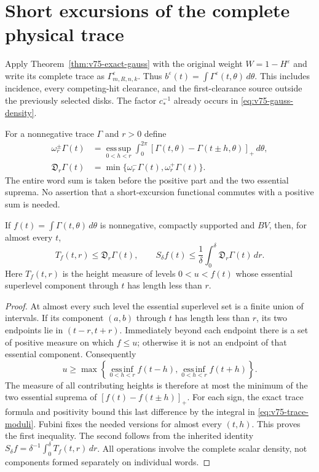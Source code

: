 \section{Short excursions of the complete physical trace}
\label{sec:v75-physical-tail}
Apply Theorem~\ref{thm:v75-exact-gauss} with the original weight
$W=1-H^\varepsilon$ and write its complete trace as
$\Gamma^\varepsilon_{m,R,n,k}$. Thus
$b^\varepsilon(t)=\int\Gamma^\varepsilon(t,\theta)\,d\theta$.
This includes incidence, every competing-hit clearance, and the
first-clearance source outside the previously selected disks.
The factor $c_*^{-1}$ already occurs in \eqref{eq:v75-gauss-density}.

For a nonnegative trace $\Gamma$ and $r>0$ define
\begin{align}
 \omega_r^\pm\Gamma(t)
  &=\operatorname*{ess\,sup}_{0<h<r}
      \int_0^{2\pi}[\Gamma(t,\theta)-\Gamma(t\pm h,\theta)]_+\,d\theta,
                                      \label{eq:v75-trace-moduli}\\
 \mathfrak D_r\Gamma(t)&=\min\{\omega_r^-\Gamma(t),\omega_r^+\Gamma(t)\}.
                                      \label{eq:v75-paired-trace}
\end{align}
The entire word sum is taken before the positive part and the two
essential suprema. No assertion that a short-excursion functional
commutes with a positive sum is needed.

\begin{lemma}
\label{lem:v75-trace-tail}
If $f(t)=\int\Gamma(t,\theta)\,d\theta$ is nonnegative,
compactly supported and $BV$, then, for almost every $t$,
\begin{equation}\label{eq:v75-trace-tail}
       T_f(t,r)\le\mathfrak D_r\Gamma(t),\qquad
       S_\delta f(t)\le\frac1\delta\int_0^\delta
                                     \mathfrak D_r\Gamma(t)\,dr.
\end{equation}
Here $T_f(t,r)$ is the height measure of levels $0<u<f(t)$ whose
essential superlevel component through $t$ has length less than $r$.
\end{lemma}
\begin{proof}
At almost every such level the essential superlevel set is a finite
union of intervals. If its component $(a,b)$ through $t$ has length
less than $r$, its two endpoints lie in $(t-r,t+r)$. Immediately
beyond each endpoint there is a set of positive measure on which
$f\le u$; otherwise it is not an endpoint of that essential component.
Consequently
\[
 u\ge\max\left\{
  \operatorname*{ess\,inf}_{0<h<r}f(t-h),
  \operatorname*{ess\,inf}_{0<h<r}f(t+h)\right\}.
\]
The measure of all contributing heights is therefore at most the
minimum of the two essential suprema of $[f(t)-f(t\pm h)]_+$.
For each sign, the exact trace formula and positivity bound this
last difference by the integral in \eqref{eq:v75-trace-moduli}.
Fubini fixes the needed versions for almost every $(t,h)$.
This proves the first inequality. The second follows from the
inherited identity $S_\delta f=\delta^{-1}\int_0^\delta T_f(t,r)\,dr$.
All operations involve the complete scalar density, not components
formed separately on individual words.
\end{proof}

